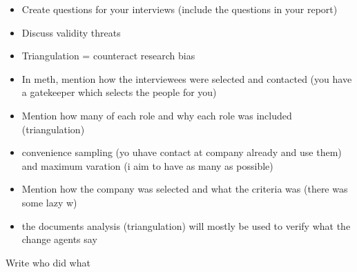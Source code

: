 \documentclass[times, 10pt,twocolumn]{Article}
\begin{document}
\begin{itemize}
\item Create questions for your interviews (include the questions in your report)
\item Discuss validity threats
\item Triangulation = counteract research bias
\item In meth, mention how the interviewees were selected and contacted (you have a gatekeeper which selects the people for you)
\item Mention how many of each role and why each role was included (triangulation)
\item convenience sampling (yo uhave contact at company already and use them) and maximum varation (i aim to have as many as possible)
\item Mention how the company was selected and what the criteria was (there was some lazy w)
\item the documents analysis (triangulation) will mostly be used to verify what the change agents say
\end{itemize}
















Write who did what
\end{document}
